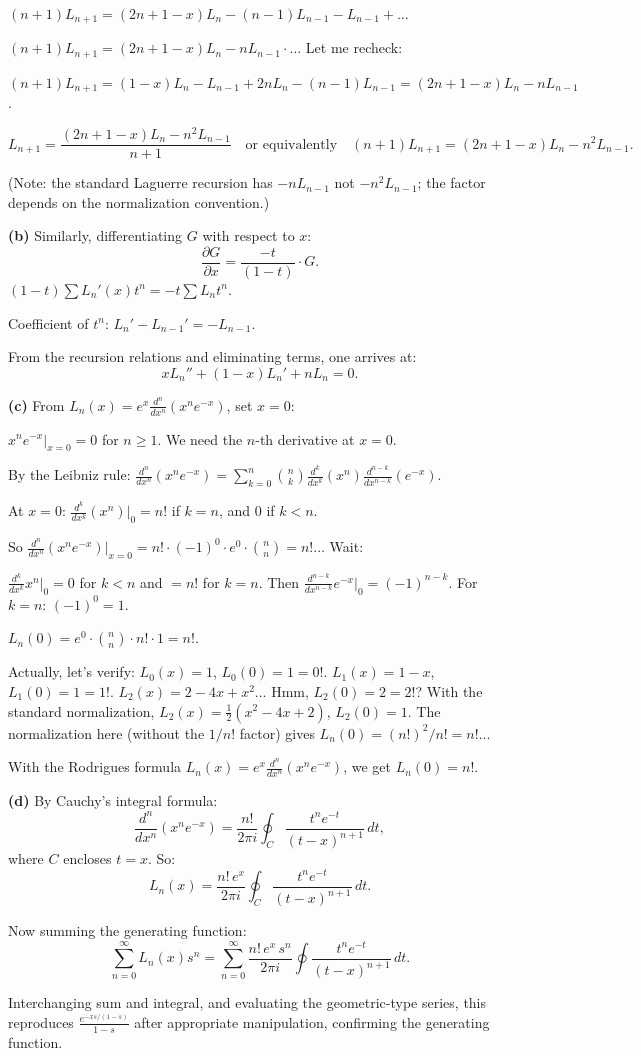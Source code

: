 \documentclass[12pt]{article}
\begin{document}
$(n+1)L_{n+1} = (2n+1-x)L_n - (n-1)L_{n-1} - L_{n-1} + \ldots$

$(n+1)L_{n+1} = (2n+1-x)L_n - nL_{n-1} \cdot$... Let me recheck:

$(n+1)L_{n+1} = (1-x)L_n - L_{n-1} + 2nL_n - (n-1)L_{n-1} = (2n+1-x)L_n - nL_{n-1}$.

\[
\boxed{L_{n+1} = \frac{(2n+1-x)L_n - n^2 L_{n-1}}{n+1}} \quad \text{or equivalently} \quad (n+1)L_{n+1} = (2n+1-x)L_n - n^2L_{n-1}.
\]

(Note: the standard Laguerre recursion has $-nL_{n-1}$ not $-n^2L_{n-1}$; the factor depends on the normalization convention.)

\textbf{(b)} Similarly, differentiating $G$ with respect to $x$:
\[
\frac{\partial G}{\partial x} = \frac{-t}{(1-t)}\cdot G.
\]
$(1-t)\sum L_n'(x)t^n = -t\sum L_n t^n$.

Coefficient of $t^n$: $L_n' - L_{n-1}' = -L_{n-1}$.

From the recursion relations and eliminating terms, one arrives at:
\[
\boxed{xL_n'' + (1-x)L_n' + nL_n = 0.}
\]

\textbf{(c)} From $L_n(x) = e^x\frac{d^n}{dx^n}(x^ne^{-x})$, set $x = 0$:

$x^ne^{-x}|_{x=0} = 0$ for $n \geq 1$. We need the $n$-th derivative at $x = 0$.

By the Leibniz rule: $\frac{d^n}{dx^n}(x^ne^{-x}) = \sum_{k=0}^n \binom{n}{k}\frac{d^k}{dx^k}(x^n)\frac{d^{n-k}}{dx^{n-k}}(e^{-x})$.

At $x=0$: $\frac{d^k}{dx^k}(x^n)\big|_0 = n!$ if $k = n$, and 0 if $k < n$.

So $\frac{d^n}{dx^n}(x^ne^{-x})\big|_{x=0} = n!\cdot(-1)^0\cdot e^0\cdot \binom{n}{n} = n!$... Wait:

$\frac{d^k}{dx^k}x^n\big|_0 = 0$ for $k<n$ and $= n!$ for $k=n$. Then $\frac{d^{n-k}}{dx^{n-k}}e^{-x}\big|_0 = (-1)^{n-k}$. For $k=n$: $(-1)^0 = 1$.

$L_n(0) = e^0 \cdot \binom{n}{n}\cdot n!\cdot 1 = n!$.

Actually, let's verify: $L_0(x) = 1$, $L_0(0) = 1 = 0!$. $L_1(x) = 1-x$, $L_1(0) = 1 = 1!$. $L_2(x) = 2-4x+x^2$... Hmm, $L_2(0) = 2 = 2!$? With the standard normalization, $L_2(x) = \frac{1}{2}(x^2-4x+2)$, $L_2(0) = 1$. The normalization here (without the $1/n!$ factor) gives $L_n(0) = (n!)^2/n! = n!$...

With the Rodrigues formula $L_n(x) = e^x\frac{d^n}{dx^n}(x^ne^{-x})$, we get $\boxed{L_n(0) = n!}$.

\textbf{(d)} By Cauchy's integral formula:
\[
\frac{d^n}{dx^n}(x^ne^{-x}) = \frac{n!}{2\pi i}\oint_C \frac{t^ne^{-t}}{(t-x)^{n+1}}\,dt,
\]
where $C$ encloses $t = x$. So:
\[
L_n(x) = \frac{n!\,e^x}{2\pi i}\oint_C \frac{t^ne^{-t}}{(t-x)^{n+1}}\,dt.
\]

Now summing the generating function:
\[
\sum_{n=0}^{\infty}L_n(x)s^n = \sum_{n=0}^{\infty}\frac{n!\,e^x\,s^n}{2\pi i}\oint\frac{t^ne^{-t}}{(t-x)^{n+1}}\,dt.
\]

Interchanging sum and integral, and evaluating the geometric-type series, this reproduces $\frac{e^{-xs/(1-s)}}{1-s}$ after appropriate manipulation, confirming the generating function.
\end{document}
